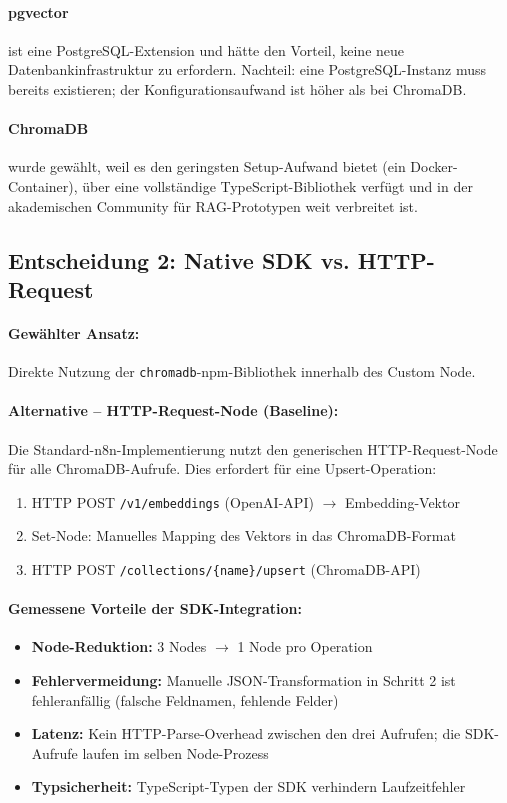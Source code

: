 \documentclass[12pt,a4paper,oneside]{report}
\begin{document}
\paragraph{pgvector} ist eine PostgreSQL-Extension und hätte den Vorteil, keine
neue Datenbankinfrastruktur zu erfordern. Nachteil: eine PostgreSQL-Instanz muss
bereits existieren; der Konfigurationsaufwand ist höher als bei ChromaDB.

\paragraph{ChromaDB} wurde gewählt, weil es den geringsten Setup-Aufwand bietet
(ein Docker-Container), über eine vollständige TypeScript-Bibliothek verfügt und
in der akademischen Community für \ac{RAG}-Prototypen weit verbreitet ist.

\subsection{Entscheidung 2: Native SDK vs. HTTP-Request}

\paragraph{Gewählter Ansatz:}
Direkte Nutzung der \texttt{chromadb}-npm-Bibliothek innerhalb des Custom Node.

\paragraph{Alternative -- HTTP-Request-Node (Baseline):}
Die Standard-n8n-Implementierung nutzt den generischen HTTP-Request-Node für alle
ChromaDB-Aufrufe. Dies erfordert für eine Upsert-Operation:
\begin{enumerate}
  \item HTTP POST \texttt{/v1/embeddings} (OpenAI-\ac{API}) $\to$ Embedding-Vektor
  \item Set-Node: Manuelles Mapping des Vektors in das ChromaDB-Format
  \item HTTP POST \texttt{/collections/\{name\}/upsert} (ChromaDB-\ac{API})
\end{enumerate}

\paragraph{Gemessene Vorteile der SDK-Integration:}
\begin{itemize}
  \item \textbf{Node-Reduktion:} 3 Nodes $\to$ 1 Node pro Operation
  \item \textbf{Fehlervermeidung:} Manuelle JSON-Transformation in Schritt 2 ist
    fehleranfällig (falsche Feldnamen, fehlende Felder)
  \item \textbf{Latenz:} Kein HTTP-Parse-Overhead zwischen den drei Aufrufen; die
    SDK-Aufrufe laufen im selben Node-Prozess
  \item \textbf{Typsicherheit:} TypeScript-Typen der SDK verhindern Laufzeitfehler
\end{itemize}
\end{document}
